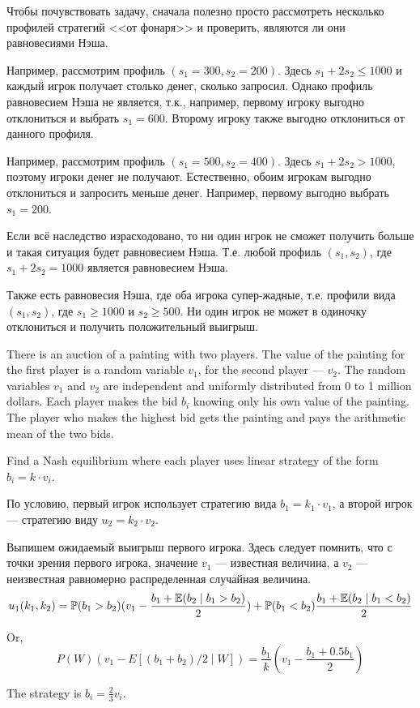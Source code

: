 \begin{solution}
Чтобы почувствовать задачу, сначала полезно просто рассмотреть несколько профилей стратегий <<от фонаря>> и проверить, являются ли они равновесиями Нэша.

Например, рассмотрим профиль $(s_1=300,s_2=200)$. Здесь $s_1+2s_2\leq 1000$ и каждый игрок получает столько денег, сколько запросил. Однако профиль  равновесием Нэша не является, т.к., например, первому игроку выгодно отклониться и выбрать $s_1=600$.  Второму игроку также выгодно отклониться от данного профиля.

Например, рассмотрим профиль $(s_1=500,s_2=400)$. Здесь $s_1+2s_2>1000$, поэтому игроки денег не получают. Естественно, обоим игрокам выгодно отклониться и запросить меньше денег. Например, первому выгодно выбрать $s_1=200$. 

Если всё наследство израсходовано, то ни один игрок не сможет получить больше и такая ситуация будет равновесием Нэша. Т.е. любой профиль $(s_1,s_2)$, где  $s_1+2s_2=1000$ является равновесием Нэша.

Также есть равновесия Нэша, где оба игрока супер-жадные, т.е. профили вида $(s_1,s_2)$, где $s_1\geq 1000$ и $s_2 \geq 500$. Ни один игрок не может в одиночку отклониться и  получить положительный выигрыш.
\end{solution}

\begin{problem}
There is an auction of a painting with two players. The value of the painting for the first player is a random variable $v_1$, for the second player --- $v_2$. The random variables $v_1$ and $v_2$ are independent and uniformly distributed from 0 to 1 million dollars. Each player makes the bid $b_i$ knowing only his own value of the painting. The player who makes the highest bid gets the painting and pays the arithmetic mean of the two bids. 

Find a Nash equilibrium where each player uses linear strategy of the form $b_i=k\cdot v_i$.
\end{problem}

\begin{solution}
По условию, первый игрок использует стратегию вида $b_1=k_1\cdot v_1$, а второй игрок --- стратегию виду $u_2=k_2\cdot v_2$. 

Выпишем ожидаемый выигрыш первого игрока. Здесь следует помнить, что с точки зрения первого игрока, значение $v_1$ --- известная величина, а $v_2$ --- неизвестная равномерно распределенная случайная величина.
\[
u_1(k_1,k_2)=\mathbb{P}(b_1>b_2)(v_1- \frac{b_1+\mathbb{E}(b_2\mid b_1>b_2)}{2}) + \mathbb{P}(b_1<b_2) \frac{b_1+\mathbb{E}(b_2\mid b_1< b_2)}{2}
\]

Or,
\[
P(W) \left( v_1 - E[(b_1+b_2)/2 \mid W] \right) = \frac{b_1}{k} \left( v_1 - \frac{b_1+0.5b_1}{2}\right)
\]

The strategy is $b_i=\frac{2}{3}v_i$.

\end{solution}

